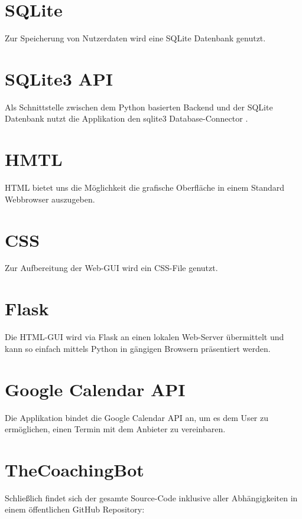     \section{SQLite}
        Zur Speicherung von Nutzerdaten wird eine SQLite Datenbank \cite{sqlite} genutzt.

    \section{SQLite3 API}
        Als Schnittstelle zwischen dem Python basierten Backend und der SQLite Datenbank nutzt die Applikation den sqlite3 Database-Connector \cite{sqlite3API}.


    \section{HMTL}
        HTML bietet uns die Möglichkeit die grafische Oberfläche in einem Standard Webbrowser auszugeben. \cite{HTML}

    \section{CSS}
        Zur Aufbereitung der Web-GUI wird ein CSS-File genutzt.

    \section{Flask}
        Die HTML-GUI wird via Flask \cite{flask} an einen lokalen Web-Server übermittelt und kann so einfach mittels Python in gängigen Browsern präsentiert werden.


    \section{Google Calendar API}
        Die Applikation bindet die Google Calendar API \cite{googleCalAPI} an, um es dem User zu ermöglichen, einen Termin mit dem Anbieter zu vereinbaren.


    \section{TheCoachingBot}
        Schließlich findet sich der gesamte Source-Code inklusive aller Abhängigkeiten in einem öffentlichen GitHub Repository: \cite{repo} 